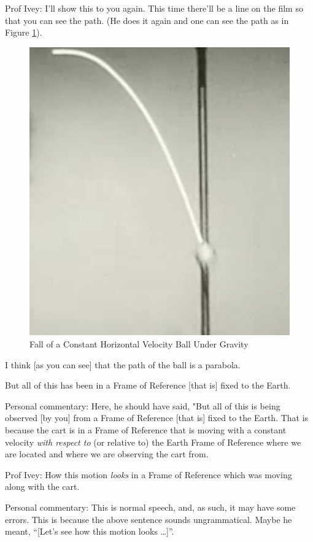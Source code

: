 \documentclass[a6paper]{article}
\begin{document}
Prof Ivey: I'll show this to you again. This time there'll be a line on the film so that you can see the path. (He does it again and one can see the path as in Figure \ref{fig: fall-of-a-constant-horizontal-velocity-ball-under-gravity}).
        \begin{figure}[h!]
            \centering
            \includegraphics[width=0.7\linewidth]{fall-of-a-constant-horizontal-velocity-ball-under-gravity.png}
            \caption{Fall of a Constant Horizontal Velocity Ball Under Gravity}
            \label{fig: fall-of-a-constant-horizontal-velocity-ball-under-gravity}
        \end{figure}

I think [as you can see] that the path of the ball is a parabola. 

But all of this has been in a Frame of Reference [that is] fixed to the Earth. 

Personal commentary: Here, he should have said, "But all of this is being observed [by you] from a Frame of Reference [that is] fixed to the Earth. That is because the cart is in a Frame of Reference that is moving with a constant velocity \emph{with respect to} (or relative to) the Earth Frame of Reference where we are located and where we are observing the cart from.

Prof Ivey: How this motion \emph{looks} in a Frame of Reference which was moving along with the cart.

Personal commentary: This is normal speech, and, as such, it may have some errors. This is because the above sentence sounds ungrammatical. Maybe he meant, ``[Let's see how this motion looks \dots]''.
\end{document}
